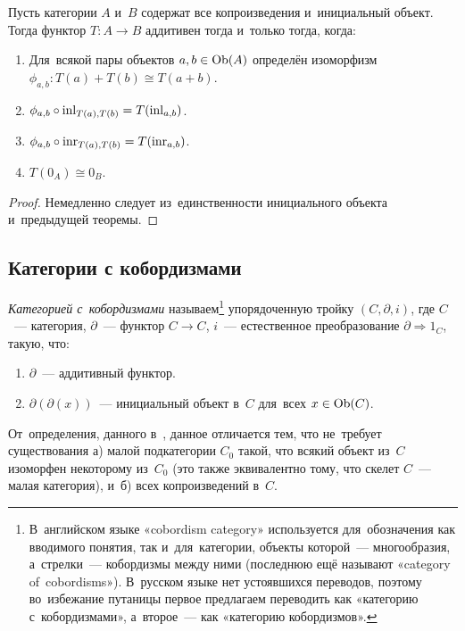 \documentclass[a4paper,oneside]{article}
\begin{document}
\begin{theorem*}
    Пусть категории $A$ и~$B$ содержат все копроизведения и~инициальный объект.
    Тогда функтор $T : A \rightarrow B$ аддитивен тогда и~только тогда, когда:
    \begin{enumerate}
        \item Для~всякой пары объектов $a, b \in \mathrm{Ob}(A)$ определён изоморфизм $\phi_{a, b} : T(a) + T(b) \cong T(a + b)$.
        \item $\phi_{a, b} \circ \mathrm{inl}_{T(a), T(b)} = T(\mathrm{inl}_{a, b})$.
        \item $\phi_{a, b} \circ \mathrm{inr}_{T(a), T(b)} = T(\mathrm{inr}_{a, b})$.
        \item $T(0_A) \cong 0_B$.
    \end{enumerate}
\end{theorem*}

\begin{proof}
    Немедленно следует из~единственности инициального объекта и~предыдущей теоремы.
\end{proof}

\subsection{Категории с кобордизмами}

\textit{Категорией с~кобордизмами} называем\footnote{
    В~английском языке «cobordism category» используется для~обозначения как вводимого понятия,
    так и~для~категории, объекты которой~— многообразия, а~стрелки~— кобордизмы между ними (последнюю
    ещё называют «category of~cobordisms»). В~русском языке нет устоявшихся переводов, поэтому
    во~избежание путаницы первое предлагаем переводить как «категорию с~кобордизмами», а~второе~—
    как «категорию кобордизмов».
} упорядоченную тройку $(C, \partial, i)$, где $C$~— категория, $\partial$~— функтор $C \rightarrow C$,
$i$~— естественное преобразование $\partial \Rightarrow 1_C$, такую, что:
\begin{enumerate}
    \item $\partial$~— аддитивный функтор.
    \item $\partial(\partial(x))$~— инициальный объект в~$C$ для~всех $x \in \mathrm{Ob}(C)$.
\end{enumerate}

От~определения, данного в~\cite{Stong68}, данное отличается тем, что не~требует существования а) малой подкатегории $C_0$
такой, что всякий объект из~$C$ изоморфен некоторому из~$C_0$ (это также эквивалентно тому, что скелет $C$~— малая категория),
и~б) всех копроизведений в~$C$.
\end{document}
